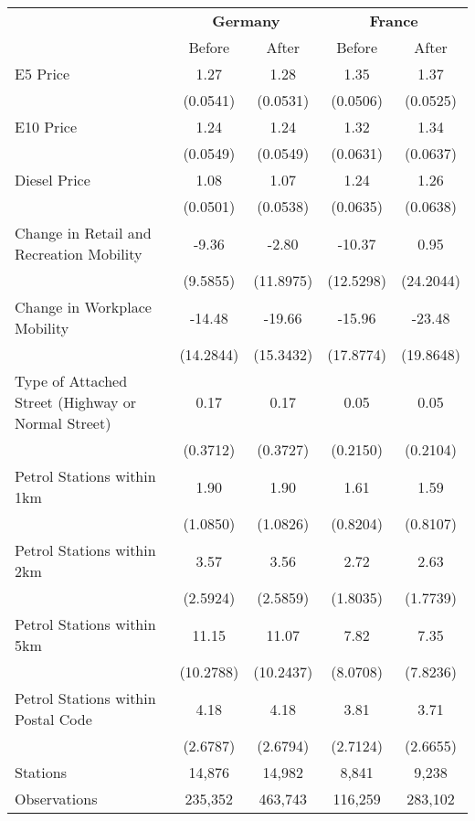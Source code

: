 \begin{tabular}{l*{4}{c}}
\toprule
                    &\multicolumn{2}{c}{\textbf{Germany}}&\multicolumn{2}{c}{\textbf{France}}\\\cmidrule(lr){2-3}\cmidrule(lr){4-5}
                    &\multicolumn{1}{c}{Before}&\multicolumn{1}{c}{After}&\multicolumn{1}{c}{Before}&\multicolumn{1}{c}{After}\\
\midrule
E5 Price            &        1.27&        1.28&        1.35&        1.37\\
                    &    (0.0541)&    (0.0531)&    (0.0506)&    (0.0525)\\
E10 Price           &        1.24&        1.24&        1.32&        1.34\\
                    &    (0.0549)&    (0.0549)&    (0.0631)&    (0.0637)\\
Diesel Price        &        1.08&        1.07&        1.24&        1.26\\
                    &    (0.0501)&    (0.0538)&    (0.0635)&    (0.0638)\\
Change in Retail and Recreation Mobility&       -9.36&       -2.80&      -10.37&        0.95\\
                    &    (9.5855)&   (11.8975)&   (12.5298)&   (24.2044)\\
Change in Workplace Mobility&      -14.48&      -19.66&      -15.96&      -23.48\\
                    &   (14.2844)&   (15.3432)&   (17.8774)&   (19.8648)\\
Type of Attached Street (Highway or Normal Street)&        0.17&        0.17&        0.05&        0.05\\
                    &    (0.3712)&    (0.3727)&    (0.2150)&    (0.2104)\\
Petrol Stations within 1km&        1.90&        1.90&        1.61&        1.59\\
                    &    (1.0850)&    (1.0826)&    (0.8204)&    (0.8107)\\
Petrol Stations within 2km&        3.57&        3.56&        2.72&        2.63\\
                    &    (2.5924)&    (2.5859)&    (1.8035)&    (1.7739)\\
Petrol Stations within 5km&       11.15&       11.07&        7.82&        7.35\\
                    &   (10.2788)&   (10.2437)&    (8.0708)&    (7.8236)\\
Petrol Stations within Postal Code&        4.18&        4.18&        3.81&        3.71\\
                    &    (2.6787)&    (2.6794)&    (2.7124)&    (2.6655)\\
\midrule
Stations            &      14,876&      14,982&       8,841&       9,238\\
Observations        &     235,352&     463,743&     116,259&     283,102\\
\bottomrule
\end{tabular}
